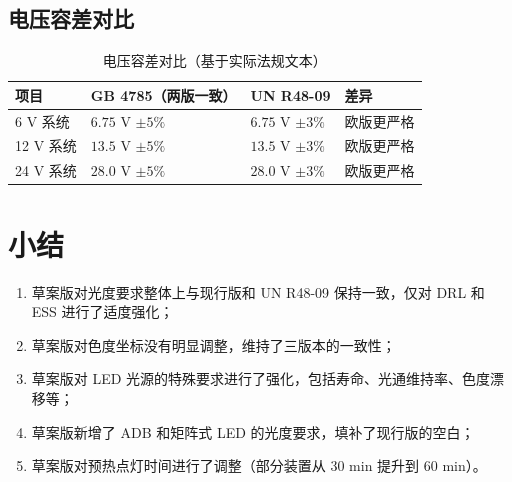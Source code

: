 \subsection{电压容差对比}

\begin{table}[H]
\centering
\caption{电压容差对比（基于实际法规文本）}
\small
\begin{tabularx}{\textwidth}{|X|X|X|X|}
\hline
\textbf{项目} & \textbf{GB 4785（两版一致）} & \textbf{UN R48-09} & \textbf{差异} \\
\hline
6 V 系统 & $6.75$ V $\pm 5\%$ & $6.75$ V $\pm 3\%$ & 欧版更严格 \\
\hline
12 V 系统 & $13.5$ V $\pm 5\%$ & $13.5$ V $\pm 3\%$ & 欧版更严格 \\
\hline
24 V 系统 & $28.0$ V $\pm 5\%$ & $28.0$ V $\pm 3\%$ & 欧版更严格 \\
\hline
\end{tabularx}
\end{table}

\section{小结}

\begin{enumerate}[leftmargin=2em]
    \item 草案版对光度要求整体上与现行版和 UN R48-09 保持一致，仅对 DRL 和 ESS 进行了适度强化；
    \item 草案版对色度坐标没有明显调整，维持了三版本的一致性；
    \item 草案版对 LED 光源的特殊要求进行了强化，包括寿命、光通维持率、色度漂移等；
    \item 草案版新增了 ADB 和矩阵式 LED 的光度要求，填补了现行版的空白；
    \item 草案版对预热点灯时间进行了调整（部分装置从 30 min 提升到 60 min）。
\end{enumerate}